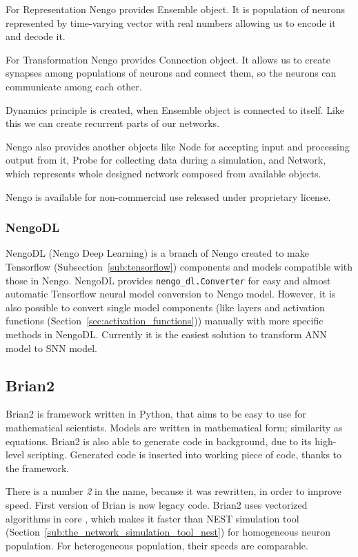For Representation Nengo provides \textsf{Ensemble} object. It is population of neurons represented by time-varying vector with real numbers allowing us to encode it and decode it.

For Transformation Nengo provides \textsf{Connection} object. It allows us to create synapses among populations of neurons and connect them, so the neurons can communicate among each other.

Dynamics principle is created, when \textsf{Ensemble} object is connected to itself. Like this we can create recurrent parts of our networks.

Nengo also provides another objects like \textsf{Node} for accepting input and processing output from it, \textsf{Probe} for collecting data during a simulation, and \textsf{Network}, which represents whole designed network composed from available objects.

Nengo is available for non-commercial use released under proprietary license.


\subsubsection{NengoDL}
\label{ssub:nengodl}

NengoDL (Nengo Deep Learning) is a branch of Nengo created to make Tensorflow (Subsection~\ref{sub:tensorflow}) components and models compatible with those in Nengo. NengoDL provides \texttt{nengo\_dl.Converter} for easy and almost automatic Tensorflow neural model conversion to Nengo model. However, it is also possible to convert single model components (like layers and activation functions (Section~\ref{sec:activation_functions})) manually with more specific methods in NengoDL. Currently it is the easiest solution to transform ANN model to SNN model.


\subsection{Brian2}%
\label{sub:brian2}

Brian2 is framework written in Python, that aims to be easy to use for mathematical scientists. Models are written in mathematical form; similarity as equations. Brian2 is also able to generate code in background, due to its high-level scripting. Generated code is inserted into working piece of code, thanks to the framework. \cite{brian}

There is a number \textit{2} in the name, because it was rewritten, in order to improve speed. First version of Brian is now legacy code. Brian2 uses vectorized algorithms in core \cite{brian-vectorized}, which makes it faster than NEST simulation tool (Section~\ref{sub:the_network_simulation_tool_nest}) for homogeneous neuron population. For heterogeneous population, their speeds are comparable. \cite{brian}

